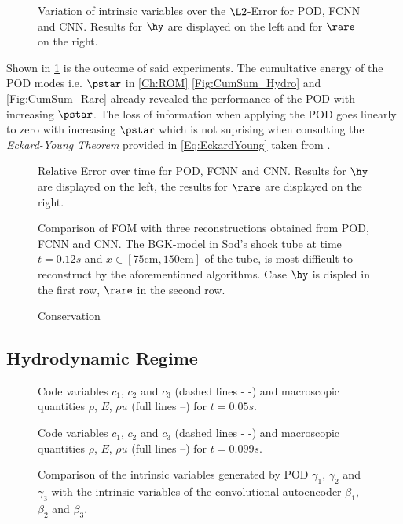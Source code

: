\begin{figure}[htbp!]
	
	\caption{Variation of intrinsic variables over the $\L2$-Error for POD, FCNN and CNN. Results for $\hy$ are displayed on the left and for $\rare$ on the right.}
	\label{Fig:IntVar}
\end{figure}
Shown in \cref{Fig:IntVar} is the outcome of said experiments. The cumultative energy of the POD modes i.e. $\pstar$ in \cref{Ch:ROM} \cref{Fig:CumSum_Hydro} and \cref{Fig:CumSum_Rare} already revealed the performance of the POD with increasing $\pstar$. The loss of information when applying the POD goes linearly to zero with increasing $\pstar$ which is not suprising when consulting the \textit{Eckard-Young Theorem} provided in \cref{Eq:EckardYoung} taken from \cite{Kutz}. 
\begin{figure}[htpb!]
	
	\caption{Relative Error over time for POD, FCNN and CNN. Results for $\hy$ are displayed on the left, the results for $\rare$ are displayed on the right.}
\end{figure}
\begin{figure}
	
	\caption{Comparison of FOM with three reconstructions obtained from POD, FCNN and CNN. The BGK-model in Sod's shock tube at time \(t=0.12s\) and \(x\in [75\textrm{cm}, 150\textrm{cm}]\) of the tube, is most difficult to reconstruct by the aforementioned algorithms. Case $\hy$ is displed in the first row, $\rare$ in the second row. }
\end{figure}
\begin{figure}[htbp!]
	
	\caption{}
\end{figure}
\begin{figure}
	
	\caption{Conservation}
\end{figure}
\subsection{Hydrodynamic Regime}

\begin{figure}[!htbp]
	\scalebox{1}{}
	\caption{Code variables \(c_1\), \(c_2\) and \(c_3\) (dashed lines - -) and macroscopic quantities \(\rho\), \(E\), \(\rho u\) (full lines --) for \(t=0.05s\).}
\end{figure}
\begin{figure}[!htbp]
	\scalebox{1}{}
	\caption{Code variables \(c_1\), \(c_2\) and \(c_3\) (dashed lines - -) and macroscopic quantities \(\rho\), \(E\), \(\rho u\) (full lines --) for \(t=0.099s\).}
\end{figure}
\begin{figure}[!htbp]
	\scalebox{.6}{}
	\caption{Comparison of the intrinsic variables generated by POD \(\gamma_1\), \(\gamma_2\) and \(\gamma_3\) with the intrinsic variables of the convolutional autoencoder \(\beta_1\), \(\beta_2\) and \(\beta_3\).}
\end{figure}

